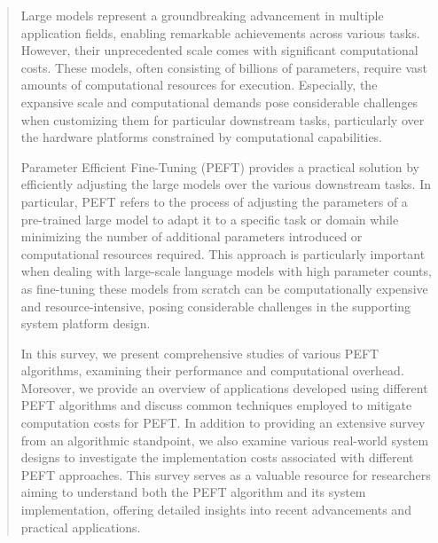 \begin{abstract}
Large models represent a groundbreaking advancement in multiple application fields, enabling remarkable achievements across various tasks. However, their unprecedented scale comes with significant computational costs. These models, often consisting of billions of parameters, require vast amounts of computational resources for execution. Especially, the expansive scale and computational demands pose considerable challenges when customizing them for particular downstream tasks, particularly over the hardware platforms constrained by computational capabilities.

Parameter Efficient Fine-Tuning (PEFT) provides a practical solution by efficiently adjusting the large models over the various downstream tasks. In particular, PEFT refers to the process of adjusting the parameters of a pre-trained large model to adapt it to a specific task or domain while minimizing the number of additional parameters introduced or computational resources required. This approach is particularly important when dealing with large-scale language models with high parameter counts, as fine-tuning these models from scratch can be computationally expensive and resource-intensive, posing considerable challenges in the supporting system platform design.

In this survey, we present comprehensive studies of various PEFT algorithms, examining their performance and computational overhead. Moreover, we provide an overview of applications developed using different PEFT algorithms and discuss common techniques employed to mitigate computation costs for PEFT. In addition to providing an extensive survey from an algorithmic standpoint, we also examine various real-world system designs to investigate the implementation costs associated with different PEFT approaches. This survey serves as a valuable resource for researchers aiming to understand both the PEFT algorithm and its system implementation, offering detailed insights into recent advancements and practical applications.

\end{abstract}